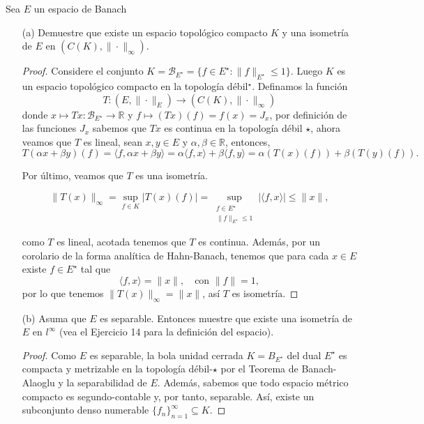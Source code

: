  Sea $E$ un espacio de Banach
 \begin{itemize}
     \item[(a)] Demuestre que existe un espacio topológico compacto $K$ y una isometría de $E$ en $\left(C(K),\|\cdot\|_{\infty}\right)$.
     \begin{proof}
         Considere el conjunto $K=\mathcal{B}_{E^{\star}}=\{f \in E^{\star}:\|f\|_{E^{\star}}\leq 1\}$. Luego $K$ es un espacio topológico compacto en la topología débil$^{\star}$. Definamos la función $$T \colon (E, \|\cdot\|_E) \to(C(K), \|\cdot\|_\infty)$$ donde $x \mapsto Tx \colon \mathcal{B}_{E^{\star}} \to \mathbb{R}$
y $f \mapsto (Tx)(f) =f(x)=J_x$, por definición de las funciones $J_x$ sabemos que $Tx$ es continua en la topología débil $\star$, ahora veamos que $T$ es lineal, sean $x, y \in E$ y $\alpha, \beta \in \mathbb{R}$, entonces,
\[
T(\alpha x + \beta y)(f) = \langle f, \alpha x + \beta y \rangle = \alpha \langle f, x \rangle + \beta \langle f, y \rangle = \alpha (T(x)(f)) + \beta (T(y)(f)).
\]

Por último, veamos que $T$ es una isometría.

\[
\|T(x)\|_\infty = \sup_{f \in K} |T(x)(f)| = \sup_{\substack{f \in E^{\star} \\ \|f\|_{E^{\star}} \leq 1}} |\langle f, x \rangle|\leq \|x\|,
\]

como $T$ es lineal, acotada tenemos que $T$ es continua. Además, por un corolario de la forma analítica de Hahn-Banach, tenemos que para cada $x \in E$ existe $f \in E^{\star}$ tal que
\[
\langle f, x \rangle = \|x\|, \quad \text{con } \|f\| = 1,
\]
por lo que tenemos $\|T(x)\|_\infty = \|x\|$, así $T$ es isometría.

     \end{proof}




     \item[(b)] Asuma que $E$ es separable. Entonces muestre que existe una isometría de $E$ en $l^{\infty}$ (vea el Ejercicio 14 para la definición del espacio).
     \begin{proof}
         
    
Como \( E \) es separable, la bola unidad cerrada \( K = B_{E^{\star}} \) del dual \( E^{\star} \) es compacta y metrizable en la topología débil-\(\star\) por el Teorema de Banach-Alaoglu y la separabilidad de \( E \). Además, sabemos que todo espacio métrico compacto es segundo-contable y, por tanto, separable. Así, existe un subconjunto denso numerable \( \{f_n\}_{n=1}^\infty \subseteq K \).


\end{proof}
\end{itemize}
